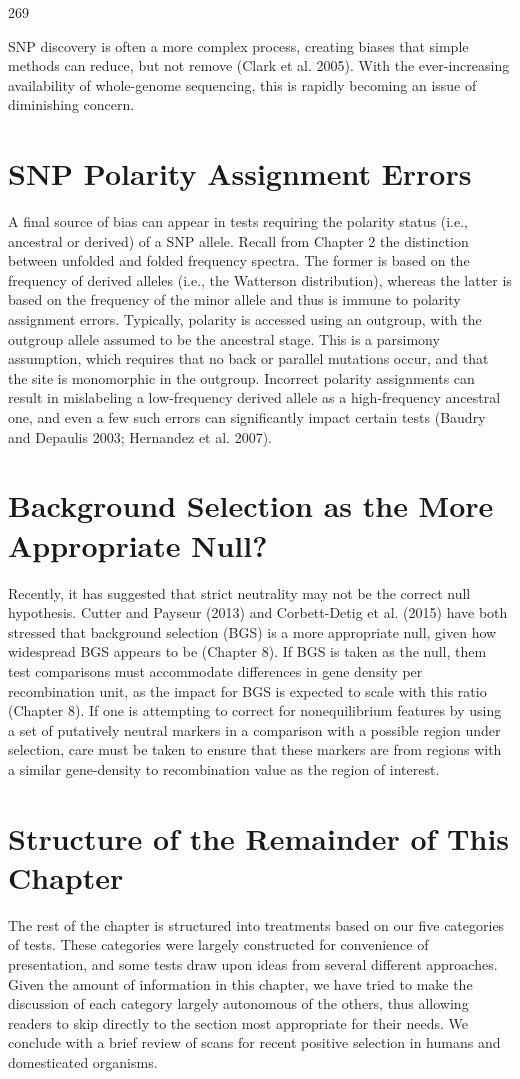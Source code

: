 \documentclass{article}
\begin{document}
269

SNP discovery is often a more complex process, creating biases that simple methods can reduce, but not remove (Clark et al. 2005). With the ever-increasing availability of whole-genome sequencing, this is rapidly becoming an issue of diminishing concern.

\section{SNP Polarity Assignment Errors}
A final source of bias can appear in tests requiring the polarity status (i.e., ancestral or derived) of a SNP allele. Recall from Chapter 2 the distinction between unfolded and folded frequency spectra. The former is based on the frequency of derived alleles (i.e., the Watterson distribution), whereas the latter is based on the frequency of the minor allele and thus is immune to polarity assignment errors. Typically, polarity is accessed using an outgroup, with the outgroup allele assumed to be the ancestral stage. This is a parsimony assumption, which requires that no back or parallel mutations occur, and that the site is monomorphic in the outgroup. Incorrect polarity assignments can result in mislabeling a low-frequency derived allele as a high-frequency ancestral one, and even a few such errors can significantly impact certain tests (Baudry and Depaulis 2003; Hernandez et al. 2007).

\section{Background Selection as the More Appropriate Null?}
Recently, it has suggested that strict neutrality may not be the correct null hypothesis. Cutter and Payseur (2013) and Corbett-Detig et al. (2015) have both stressed that background selection (BGS) is a more appropriate null, given how widespread BGS appears to be (Chapter 8). If BGS is taken as the null, them test comparisons must accommodate differences in gene density per recombination unit, as the impact for BGS is expected to scale with this ratio (Chapter 8). If one is attempting to correct for nonequilibrium features by using a set of putatively neutral markers in a comparison with a possible region under selection, care must be taken to ensure that these markers are from regions with a similar gene-density to recombination value as the region of interest.

\section{Structure of the Remainder of This Chapter}
The rest of the chapter is structured into treatments based on our five categories of tests. These categories were largely constructed for convenience of presentation, and some tests draw upon ideas from several different approaches. Given the amount of information in this chapter, we have tried to make the discussion of each category largely autonomous of the others, thus allowing readers to skip directly to the section most appropriate for their needs. We conclude with a brief review of scans for recent positive selection in humans and domesticated organisms.
\end{document}
